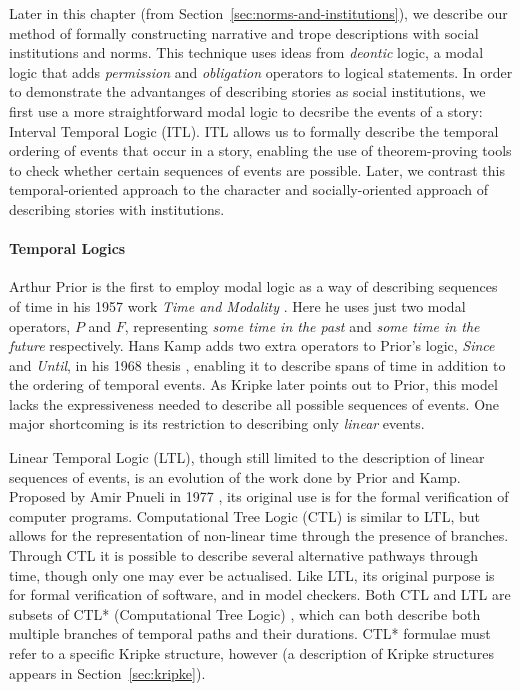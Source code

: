 \documentclass[11pt]{report}
\begin{document}
Later in this chapter (from Section~\ref{sec:norms-and-institutions}), we describe our method of
formally constructing narrative and trope descriptions with social institutions
and norms. This technique uses ideas from \emph{deontic} logic, a modal logic
that adds \emph{permission} and \emph{obligation} operators to logical
statements. In order to demonstrate the advantanges of describing stories as
social institutions, we first use a more straightforward modal logic to decsribe
the events of a story: Interval Temporal Logic (ITL). ITL allows us to formally
describe the temporal ordering of events that occur in a story, enabling the use
of theorem-proving tools to check whether certain sequences of events are
possible. Later, we contrast this temporal-oriented approach to the character
and socially-oriented approach of describing stories with institutions.

\paragraph{Temporal Logics}
Arthur Prior is the first to employ modal logic as a way of describing sequences of time in his 1957 work \emph{Time and Modality} \citep{prior2003time}. Here he uses just two modal operators, $P$ and $F$, representing \emph{some time in the past} and \emph{some time in the future} respectively.
Hans Kamp adds two extra operators to Prior's logic, \emph{Since} and \emph{Until}, in his 1968 thesis \citep{kamp1968tense}, enabling it to describe spans of time in addition to the ordering of temporal events.
As Kripke later points out to Prior, this model lacks the expressiveness needed to describe all possible sequences of events. One major shortcoming is its restriction to describing only \emph{linear} events. 

Linear Temporal Logic (LTL), though still limited to the description of linear sequences of events, is an evolution of the work done by Prior and Kamp. Proposed by Amir Pnueli in 1977 \citep{pnueli1977temporal}, its original use is for the formal verification of computer programs.
Computational Tree Logic (CTL) \citep{ben1983temporal} is similar to LTL, but allows for the representation of non-linear time through the presence of branches. Through CTL it is possible to describe several alternative pathways through time, though only one may ever be actualised. Like LTL, its original purpose is for formal verification of software, and in model checkers.
Both CTL and LTL are subsets of CTL* (Computational Tree Logic) \citep{emerson1986sometimes}, which can both describe both multiple branches of temporal paths and their durations. CTL* formulae must refer to a specific Kripke structure, however (a description of Kripke structures appears in Section~\ref{sec:kripke}).
\end{document}
